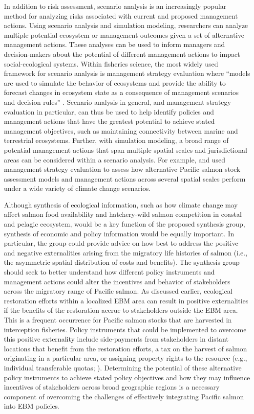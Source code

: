 In addition to risk assessment, scenario analysis is an increasingly popular
method for analyzing risks associated with current and proposed management
actions. Using scenario analysis and simulation modeling, researchers can
analyze multiple potential ecosystem or management outcomes given a set of
alternative management actions. These analyses can be used to inform managers
and decision-makers about the potential of different management actions to
impact social-ecological systems. Within fisheries science, the most widely used
framework for scenario analysis is management strategy evaluation where ``models
are used to simulate the behavior of ecosystems and provide the ability to
forecast changes in ecosystem state as a consequence of management scenarios and
decision rules'' \citep{Levin2009}. Scenario analysis in general, and management
strategy evaluation in particular, can thus be used to help identify policies
and management actions that have the greatest potential to achieve stated
management objectives, such as maintaining connectivity between marine and
terrestrial ecosystems. Further, with simulation modeling, a broad range of
potential management actions that span multiple spatial scales and
jurisdictional areas can be considered within a scenario analysis. For example,
\citet{Dorner2009a} and \citet{Dorner2013} used management strategy evaluation
to assess how alternative Pacific salmon stock assessment models and management
actions across several spatial scales perform under a wide variety of climate
change scenarios.

Although synthesis of ecological information, such as how climate change may
affect salmon food availability and hatchery-wild salmon competition in coastal
and pelagic ecosystem, would be a key function of the proposed synthesis group,
synthesis of economic and policy information would be equally important. In
particular, the group could provide advice on how best to address the positive
and negative externalities arising from the migratory life histories of salmon
(i.e., the asymmetric spatial distribution of costs and benefits). The synthesis
group should seek to better understand how different policy instruments and
management actions could alter the incentives and behavior of stakeholders
across the migratory range of Pacific salmon. As discussed earlier, ecological
restoration efforts within a localized EBM area can result in positive
externalities if the benefits of the restoration accrue to stakeholders outside
the EBM area. This is a frequent occurrence for Pacific salmon stocks that are
harvested in interception fisheries. Policy instruments that could be
implemented to overcome this positive externality include side-payments from
stakeholders in distant locations that benefit from the restoration efforts, a
tax on the harvest of salmon originating in a particular area, or assigning
property rights to the resource (e.g., individual transferable quotas;
\citealp{Howlett2009a}). Determining the potential of these alternative policy
instruments to achieve stated policy objectives and how they may influence
incentives of stakeholders across broad geographic regions is a necessary
component of overcoming the challenges of effectively integrating Pacific salmon
into EBM policies.


